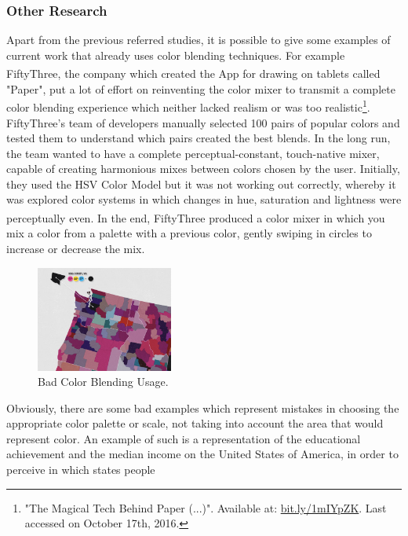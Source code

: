 \subsubsection{Other Research}
\label{subsubsec:other_research}
%
Apart from the previous referred studies, it is possible to give some
examples of current work that already uses color blending techniques. For example FiftyThree\textsuperscript{\textregistered},
the company which created the App for drawing on tablets called "Paper", put a lot of effort on reinventing the color mixer to
transmit a complete color blending experience which neither lacked realism or was too realistic\footnote{"The Magical Tech
Behind Paper (...)". Available at: \url{bit.ly/1mIYpZK}. Last accessed on October 17th, 2016.}. FiftyThree's team
of developers manually selected 100 pairs of popular colors and tested them to understand which pairs created the
best blends. In the long run, the team wanted to have a complete perceptual-constant, touch-native mixer, capable of
creating harmonious mixes between colors chosen by the user. Initially, they used the HSV Color Model but it was not
working out correctly, whereby it was explored color systems in which changes in hue, saturation and lightness were
perceptually even. In the end, FiftyThree\textsuperscript{\textregistered} produced a color mixer in which you mix
a color from a palette with a previous color, gently swiping in circles to increase or decrease the mix.\par
%
\begin{figure}
	\centering
    \vspace{-\baselineskip}
    \includegraphics[width=0.4\textwidth]{images/background/CMYKbad.png}
    \caption[Color Blending: CMY(K) Bad Example]{Bad Color Blending Usage.\protect\footnotemark[29]}
    \label{fig:cmykbad}
\end{figure}
%
Obviously, there are some bad examples which represent mistakes in choosing the appropriate color palette or scale,
not taking into account the area that would represent color. An example of such is a representation of the
educational achievement and the median income on the United States of America, in order to perceive in which states people
